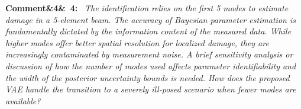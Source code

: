 \documentclass[11pt]{article}
\newenvironment{rcomment}[1]{\par\bigskip\noindent\textbf{Comment\ifx&#1&\else\ #1\fi:}\ \itshape}{\par}
\newenvironment{action}{\par\smallskip\noindent\color{resp}\textbf{Action:}\ }{\par}
\begin{document}

\begin{rcomment}{4}
The identification relies on the first 5 modes to estimate damage in a 5-element beam. The accuracy of Bayesian
parameter estimation is fundamentally dictated by the information content of the measured data. While higher modes
offer better spatial resolution for localized damage, they are increasingly contaminated by measurement noise. A brief
sensitivity analysis or discussion of how the number of modes used affects parameter identifiability and the width of
the posterior uncertainty bounds is needed. How does the proposed VAE handle the transition to a severely ill-posed
scenario when fewer modes are available?
\end{rcomment}
\end{document}
